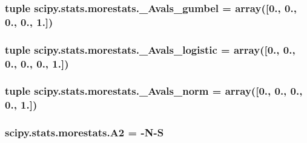 \subsubsection[{\+\_\+\+Avals\+\_\+gumbel}]{\setlength{\rightskip}{0pt plus 5cm}tuple scipy.\+stats.\+morestats.\+\_\+\+Avals\+\_\+gumbel = array(\mbox{[}0., 0., 0., 0., 1.\mbox{]})}\label{namespacescipy_1_1stats_1_1morestats_abc2f7f99bb78a5601c155cceacd2e036}
\hypertarget{namespacescipy_1_1stats_1_1morestats_a141be187dee0d0b2ed061081ceeb08f9}{}
\subsubsection[{\+\_\+\+Avals\+\_\+logistic}]{\setlength{\rightskip}{0pt plus 5cm}tuple scipy.\+stats.\+morestats.\+\_\+\+Avals\+\_\+logistic = array(\mbox{[}0., 0., 0., 0., 0., 1.\mbox{]})}\label{namespacescipy_1_1stats_1_1morestats_a141be187dee0d0b2ed061081ceeb08f9}
\hypertarget{namespacescipy_1_1stats_1_1morestats_a6685b0049404f34263a74f571743ea20}{}
\subsubsection[{\+\_\+\+Avals\+\_\+norm}]{\setlength{\rightskip}{0pt plus 5cm}tuple scipy.\+stats.\+morestats.\+\_\+\+Avals\+\_\+norm = array(\mbox{[}0., 0., 0., 0., 1.\mbox{]})}\label{namespacescipy_1_1stats_1_1morestats_a6685b0049404f34263a74f571743ea20}
\hypertarget{namespacescipy_1_1stats_1_1morestats_abc288edd80d387c4455e549e3d54b616}{}
\subsubsection[{A2}]{\setlength{\rightskip}{0pt plus 5cm}scipy.\+stats.\+morestats.\+A2 = -\/{\bf N}-\/{\bf S}}\label{namespacescipy_1_1stats_1_1morestats_abc288edd80d387c4455e549e3d54b616}
\hypertarget{namespacescipy_1_1stats_1_1morestats_ad38f5eb205317368cf1cae4038cc91fc}{}
